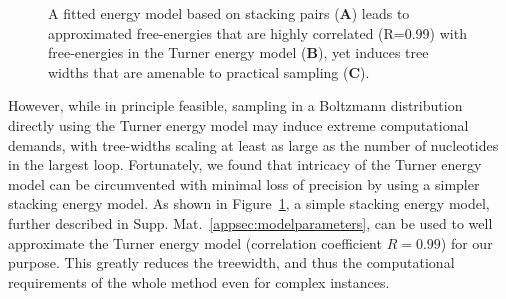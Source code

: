 \documentclass[]{bmcart}
\newcommand{\revised}[1]{{\color{red} #1}}
\begin{document}
{\begin{figure}
	\caption{\revised{A fitted energy model based on stacking pairs ({\sffamily\bfseries A}) leads to approximated free-energies that are highly correlated (R=0.99) with free-energies in the Turner energy model ({\sffamily\bfseries B}), yet induces tree widths that are amenable to practical sampling ({\sffamily\bfseries C})}.\label{fig:correlation}}
\end{figure}

However, while in principle feasible, sampling in a Boltzmann distribution directly using the Turner energy model may induce extreme computational demands, with tree-widths scaling at least as large as the number of nucleotides in the largest loop. Fortunately, we found that intricacy of the Turner energy model can be circumvented with minimal loss of precision by using a simpler stacking energy model. As shown in Figure~\ref{fig:correlation}, a simple stacking energy model, further described in Supp. Mat.~\ref{appsec:modelparameters}, can be used to well approximate the Turner energy model (correlation coefficient $R=0.99$) for our purpose. This greatly reduces the treewidth, and thus the computational requirements of the whole method even for complex instances.
}
\end{document}
